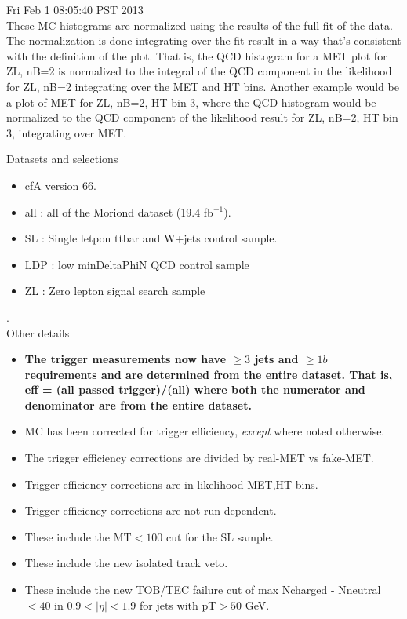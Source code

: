 \documentclass[11pt]{article}
\begin{document}
  Fri Feb  1 08:05:40 PST 2013 \\


  These MC histograms are normalized using the results of the full fit of the data.
  The normalization is done integrating over the fit result in a way that's consistent
  with the definition of the plot.
  That is, the QCD histogram for a MET plot for ZL, nB=2 is normalized to the
  integral of the QCD component in the likelihood for ZL, nB=2 integrating
  over the MET and HT bins.
  Another example would be a plot of MET for ZL, nB=2, HT bin 3, where the
  QCD histogram would be normalized to the QCD component of the likelihood
  result for ZL, nB=2, HT bin 3, integrating over MET.

  \vspace{1cm}

   Datasets and selections
   \begin{itemize}
     \item cfA version 66.
     \item all : all of the Moriond dataset (19.4 fb$^{-1}$).
     \item SL : Single letpon ttbar and W+jets control sample.
     \item LDP : low minDeltaPhiN QCD control sample
     \item ZL : Zero lepton signal search sample
   \end{itemize}

.\\

   Other details
   \begin{itemize}
     \item {\bf The trigger measurements now have $\ge3$ jets and $\ge1b$ requirements
                 and are determined from the entire dataset.  That is, eff = (all passed trigger)/(all)
                 where both the numerator and denominator are from the entire dataset.}
     \item MC has been corrected for trigger efficiency, {\it except} where noted otherwise.
     \item  The trigger efficiency corrections are divided by real-MET vs fake-MET.
     \item Trigger efficiency corrections are in likelihood MET,HT bins.
     \item Trigger efficiency corrections are not run dependent.
     \item These include the MT$<100$ cut for the SL sample.
     \item These include the new isolated track veto.
     \item These include the new TOB/TEC failure cut of max Ncharged - Nneutral $<40$ in $0.9<|\eta|<1.9$ for
             jets with pT$>50$ GeV.
   \end{itemize}
\end{document}
